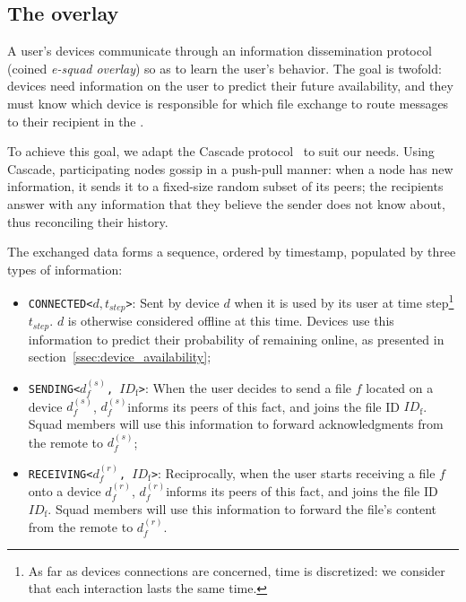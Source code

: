 
\newcommand\fileid{\ensuremath{ID_{\text{f}}}}
\newcommand\sendingdevice{\ensuremath{d^{(s)}_f}}
\newcommand\recdevice{\ensuremath{d^{(r)}_f}}

\subsection{The \squad overlay}
\label{sec:squad_overlay}

A user's devices communicate through an information dissemination protocol (coined \emph{e-squad overlay}) so as to learn the user's behavior.
The goal is twofold: 
devices need information on the user to predict their future availability, 
and they must know which device is responsible for which file exchange to route messages to their recipient in the \squad.

To achieve this goal, we adapt the Cascade protocol~\cite{luxey:cascade} to suit our needs. 
Using Cascade, participating nodes gossip in a push-pull manner: 
when a node has new information, it sends it to a fixed-size random subset of its peers; 
the recipients answer with any information that they believe the sender does not know about, thus reconciling their history.

The exchanged data forms a sequence, ordered by timestamp, populated by three types of information:
\begin{itemize}
	\item \texttt{CONNECTED<$d, t_{step}$>}: Sent by device $d$ when it is used by its user at time step\footnote{As far as devices connections are concerned, time is discretized: we consider that each interaction lasts the same time.} $t_{step}$. $d$ is otherwise considered offline at this time. Devices use this information to predict their probability of remaining online, as presented in section~\ref{ssec:device_availability};
	\item \texttt{SENDING<\sendingdevice, \fileid>}: When the user decides to send a file $f$ located on a device \sendingdevice, \sendingdevice informs its peers of this fact, and joins the file ID \fileid. Squad members will use this information to forward acknowledgments from the remote to \sendingdevice;
	\item \texttt{RECEIVING<\recdevice, \fileid>}: Reciprocally, when the user starts receiving a file $f$ onto a device \recdevice, \recdevice informs its peers of this fact, and joins the file ID \fileid. Squad members will use this information to forward the file's content from the remote to \recdevice.
\end{itemize}

